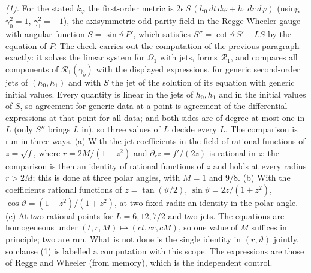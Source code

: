 \emph{(1).} For the stated $k_{\varphi}$ the first-order metric is $2\epsilon\,S\,(h_{0}\,dt\,d\varphi + h_{1}\,dr\,d\varphi)$ (using $\gamma_{0}^{2} = 1$, $\gamma_{1}^{2} = -1$), the axisymmetric odd-parity field in the Regge-Wheeler gauge with angular function $S = \sin\vartheta\,P'$, which satisfies $S'' = \cot\vartheta\,S' - LS$ by the equation of $P$. The check carries out the computation of the previous paragraph exactly: it solves the linear system for $\Omega_{1}$ with jets, forms $\mathcal{R}_{1}$, and compares all components of $\mathcal{R}_{1}(\gamma_{b})$ with the displayed expressions, for generic second-order jets of $(h_{0}, h_{1})$ and with $S$ the jet of the solution of its equation with generic initial values. Every quantity is linear in the jets of $h_{0}, h_{1}$ and in the initial values of $S$, so agreement for generic data at a point is agreement of the differential expressions at that point for all data; and both sides are of degree at most one in $L$ (only $S''$ brings $L$ in), so three values of $L$ decide every $L$. The comparison is run in three ways. (a) With the jet coefficients in the field of rational functions of $z = \sqrt f$, where $r = 2M/(1 - z^{2})$ and $\partial_{r}z = f'/(2z)$ is rational in $z$: the comparison is then an identity of rational functions of $z$ and holds at every radius $r > 2M$; this is done at three polar angles, with $M = 1$ and $9/8$. (b) With the coefficients rational functions of $z = \tan(\vartheta/2)$, $\sin\vartheta = 2z/(1 + z^{2})$, $\cos\vartheta = (1 - z^{2})/(1 + z^{2})$, at two fixed radii: an identity in the polar angle. (c) At two rational points for $L = 6, 12, 7/2$ and two jets. The equations are homogeneous under $(t, r, M) \mapsto (ct, cr, cM)$, so one value of $M$ suffices in principle; two are run. What is not done is the single identity in $(r, \vartheta)$ jointly, so clause (1) is labelled a computation with this scope. The expressions are those of Regge and Wheeler (from memory), which is the independent control.


